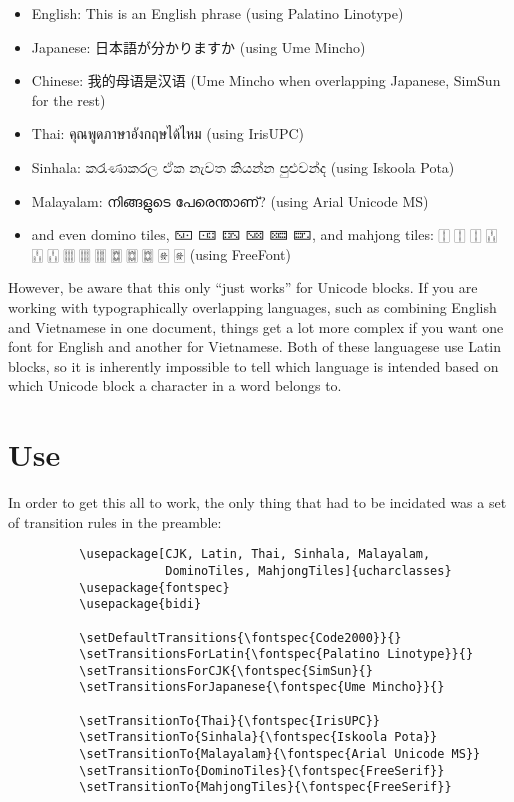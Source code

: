 ﻿\documentclass{article}
\newenvironment{itemlist}{%
  \begin{itemize}
	\setlength{\itemsep}{0pt}
	\setlength{\parsep}{0pt}
	\setlength{\topsep}{0pt}
	\setlength{\partopsep}{0pt}
	\setlength{\parskip}{0pt}
	\setlength{\labelsep}{5pt}}%
{
  \end{itemize}}
\begin{document}
		\begin{itemlist}
			\item English: This is an English phrase (using Palatino Linotype)
			\item Japanese: 日本語が分かりますか (using Ume Mincho)
			\item Chinese: 我的母语是汉语 (Ume Mincho when overlapping Japanese, SimSun for the rest)
			\item Thai: คุณพูดภาษาอังกฤษได้ไหม (using IrisUPC)
			\item Sinhala: කරැණාකරල ඒක නැවත කියන්න පුළුවන්ද (using Iskoola Pota)
			\item Malayalam: നിങ്ങളുടെ പേരെന്താണ്? (using Arial Unicode MS)
			\item and even domino tiles, 🁇 🀼 🁐 🁋 🁚 🁝, and mahjong tiles: 🀑 🀑 🀑 🀒 🀒 🀒 🀕 🀕 🀕 🀗 🀗 🀗 🀅 🀅 (using FreeFont)
		\end{itemlist}

		However, be aware that this only “just works” for Unicode blocks. If you are working with typographically overlapping languages, such as combining English and Vietnamese in one document, things get a lot more complex if you want one font for English and another for Vietnamese. Both of these languagese use Latin blocks, so it is inherently impossible to tell which language is intended based on which Unicode block a character in a word belongs to.


	\section{Use}

		In order to get this all to work, the only thing that had to be incidated was a set of transition rules in the preamble:
		
		\disableTransitionRules
		\begin{verbatim}
　　　　　　\usepackage[CJK, Latin, Thai, Sinhala, Malayalam,
　　　　　　            DominoTiles, MahjongTiles]{ucharclasses}
　　　　　　\usepackage{fontspec}
　　　　　　\usepackage{bidi}

　　　　　　\setDefaultTransitions{\fontspec{Code2000}}{}
　　　　　　\setTransitionsForLatin{\fontspec{Palatino Linotype}}{}
　　　　　　\setTransitionsForCJK{\fontspec{SimSun}{}
　　　　　　\setTransitionsForJapanese{\fontspec{Ume Mincho}}{}

　　　　　　\setTransitionTo{Thai}{\fontspec{IrisUPC}}
　　　　　　\setTransitionTo{Sinhala}{\fontspec{Iskoola Pota}}
　　　　　　\setTransitionTo{Malayalam}{\fontspec{Arial Unicode MS}}
　　　　　　\setTransitionTo{DominoTiles}{\fontspec{FreeSerif}}
　　　　　　\setTransitionTo{MahjongTiles}{\fontspec{FreeSerif}}
		\end{verbatim}
		\enableTransitionRules
\end{document}
